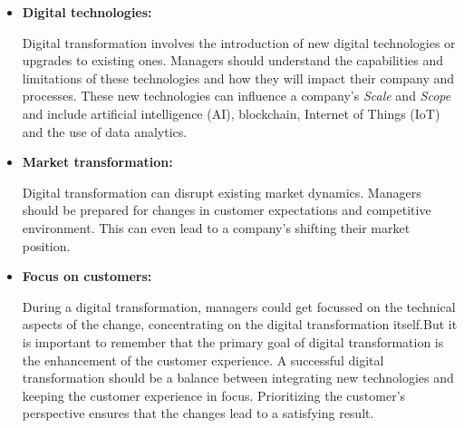 \documentclass[a4]{scrartcl}
\begin{document}
\begin{itemize}
	
	\item \textbf{Digital technologies:} 
	
	Digital transformation involves the introduction of new digital technologies or upgrades to existing ones. Managers should understand the capabilities and limitations of these technologies and how they will impact their company and processes. These new technologies can influence a company's \textit{Scale} and \textit{Scope} and include artificial intelligence (AI), blockchain, Internet of Things (IoT) and the use of data analytics.~\cite{AI,DDDM,  iot, blockchain}
	
	
	\item \textbf{Market transformation:} 
	
	Digital transformation can disrupt existing market dynamics. Managers should be prepared for changes in customer expectations and competitive environment. This can even lead to a company's shifting their market position. \cite{digitalmatrix, vial, DTOT, leadingdigital}
	
	
	\item \textbf{Focus on customers:} 
	
	During a digital transformation, managers could get focussed on the technical aspects of the change, concentrating on the digital transformation itself.But it is important to remember that the primary goal of  digital transformation is the enhancement of the customer experience. 
	A successful digital transformation should be a balance between integrating new technologies and keeping the customer experience in focus. Prioritizing the customer's perspective ensures that the changes lead to a satisfying result.
	
	
\end{itemize}




	
	
\end{document}
